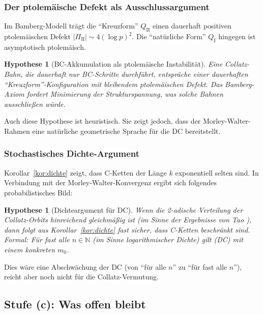 \documentclass[12pt,a4paper]{article}
\newtheorem{hypothese}[definition]{Hypothese}
\newcommand{\N}{\mathbb{N}}
\begin{document}
\subsubsection{Der ptolemäische Defekt als Ausschlussargument}

Im Bamberg-Modell trägt die ``Kreuzform'' $Q_\mathrm{II}$
einen dauerhaft positiven ptolemäischen Defekt $|\Pi_\mathrm{II}| \sim 4(\log p)^2$.
Die ``natürliche Form'' $Q_\mathrm{I}$ hingegen ist asymptotisch ptolemäisch.

\begin{hypothese}[BC-Akkumulation als ptolemäische Instabilität]
\label{hyp:ptolemy}
Eine Collatz-Bahn, die dauerhaft nur BC-Schritte durchführt,
entspräche einer dauerhaften ``Kreuzform''-Konfiguration
mit bleibendem ptolemäischen Defekt.
Das Bamberg-Axiom fordert Minimierung der Strukturspannung,
was solche Bahnen ausschließen würde.
\end{hypothese}

Auch diese Hypothese ist heuristisch. Sie zeigt jedoch,
dass der Morley-Walter-Rahmen eine natürliche geometrische
Sprache für die DC bereitstellt.

\subsubsection{Stochastisches Dichte-Argument}

Korollar~\ref{kor:dichte} zeigt, dass C-Ketten der Länge $k$
exponentiell selten sind. In Verbindung mit der Morley-Walter-Konvergenz
ergibt sich folgendes probabilistisches Bild:

\begin{hypothese}[Dichteargument für DC]
\label{hyp:dichte}
Wenn die 2-adische Verteilung der Collatz-Orbits hinreichend
gleichmäßig ist (im Sinne der Ergebnisse von Tao \cite{tao-collatz}),
dann folgt aus Korollar~\ref{kor:dichte} fast sicher,
dass C-Ketten beschränkt sind.
Formal: Für fast alle $n \in \N$ (im Sinne logarithmischer Dichte)
gilt (DC) mit einem konkreten $m_0$.
\end{hypothese}

Dies wäre eine Abschwächung der DC (von ``für alle $n$'' zu
``für fast alle $n$''), reicht aber noch nicht für die
Collatz-Vermutung.

\subsection{Stufe (c): Was offen bleibt}
\end{document}
